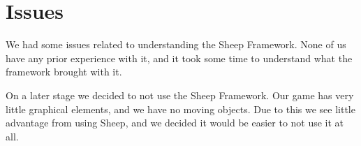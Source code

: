 \section{Issues}
\label{sec:issues} 
We had some issues related to understanding the Sheep Framework. None of us
have any prior experience with it, and it took some time to understand what the
framework brought with it. 

On a later stage we decided to not use the Sheep Framework. Our game has very little graphical elements, and we have no moving objects. Due to this we see little advantage from using Sheep, and we decided it would be easier to not use it at all.
